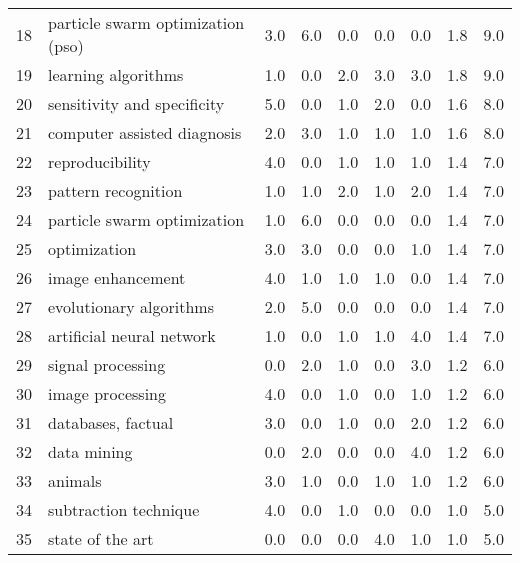 \begin{tabular}{llrrrrrrr}
18 &        particle swarm optimization (pso) &   3.0 &   6.0 &   0.0 &   0.0 &   0.0 &   1.8 &    9.0 \\
19 &                      learning algorithms &   1.0 &   0.0 &   2.0 &   3.0 &   3.0 &   1.8 &    9.0 \\
20 &              sensitivity and specificity &   5.0 &   0.0 &   1.0 &   2.0 &   0.0 &   1.6 &    8.0 \\
21 &              computer assisted diagnosis &   2.0 &   3.0 &   1.0 &   1.0 &   1.0 &   1.6 &    8.0 \\
22 &                          reproducibility &   4.0 &   0.0 &   1.0 &   1.0 &   1.0 &   1.4 &    7.0 \\
23 &                      pattern recognition &   1.0 &   1.0 &   2.0 &   1.0 &   2.0 &   1.4 &    7.0 \\
24 &              particle swarm optimization &   1.0 &   6.0 &   0.0 &   0.0 &   0.0 &   1.4 &    7.0 \\
25 &                             optimization &   3.0 &   3.0 &   0.0 &   0.0 &   1.0 &   1.4 &    7.0 \\
26 &                        image enhancement &   4.0 &   1.0 &   1.0 &   1.0 &   0.0 &   1.4 &    7.0 \\
27 &                  evolutionary algorithms &   2.0 &   5.0 &   0.0 &   0.0 &   0.0 &   1.4 &    7.0 \\
28 &                artificial neural network &   1.0 &   0.0 &   1.0 &   1.0 &   4.0 &   1.4 &    7.0 \\
29 &                        signal processing &   0.0 &   2.0 &   1.0 &   0.0 &   3.0 &   1.2 &    6.0 \\
30 &                         image processing &   4.0 &   0.0 &   1.0 &   0.0 &   1.0 &   1.2 &    6.0 \\
31 &                       databases, factual &   3.0 &   0.0 &   1.0 &   0.0 &   2.0 &   1.2 &    6.0 \\
32 &                              data mining &   0.0 &   2.0 &   0.0 &   0.0 &   4.0 &   1.2 &    6.0 \\
33 &                                  animals &   3.0 &   1.0 &   0.0 &   1.0 &   1.0 &   1.2 &    6.0 \\
34 &                    subtraction technique &   4.0 &   0.0 &   1.0 &   0.0 &   0.0 &   1.0 &    5.0 \\
35 &                         state of the art &   0.0 &   0.0 &   0.0 &   4.0 &   1.0 &   1.0 &    5.0 \\

\end{tabular}
